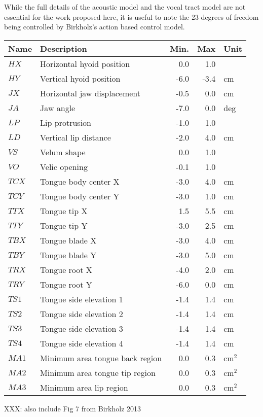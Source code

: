 \documentclass{article}
\begin{document}
While the full details of the acoustic model
and the vocal tract model are not
essential for the work proposed here,
it is useful to note
the 23 degrees of freedom
being controlled by Birkholz's
action based control model.

\begin{tabular}{llrrl}
\toprule
{\bf Name} & {\bf Description} & {\bf Min.} & {\bf Max} & {\bf Unit} \\
\midrule
$HX$ & Horizontal hyoid position & 0.0 & 1.0 & \\
$HY$ & Vertical hyoid position & -6.0 & -3.4 & cm \\
$JX$ & Horizontal jaw displacement & -0.5 & 0.0 & cm \\
$JA$ & Jaw angle & -7.0 & 0.0 & deg \\
$LP$ & Lip protrusion & -1.0 & 1.0 & \\
$LD$ & Vertical lip distance & -2.0 & 4.0 & cm \\
$VS$ & Velum shape & 0.0 & 1.0 & \\
$VO$ & Velic opening & -0.1 & 1.0 & \\
$TCX$ & Tongue body center X & -3.0 & 4.0 & cm \\
$TCY$ & Tongue body center Y & -3.0 & 1.0 & cm \\
$TTX$ & Tongue tip X & 1.5 & 5.5 & cm \\
$TTY$ & Tongue tip Y & -3.0 & 2.5 & cm \\
$TBX$ & Tongue blade X & -3.0 & 4.0 & cm \\
$TBY$ & Tongue blade Y & -3.0 & 5.0 & cm \\
$TRX$ & Tongue root X & -4.0 & 2.0 & cm \\
$TRY$ & Tongue root Y & -6.0 & 0.0 & cm \\
$TS1$ & Tongue side elevation 1 & -1.4 & 1.4 & cm \\
$TS2$ & Tongue side elevation 2 & -1.4 & 1.4 & cm \\
$TS3$ & Tongue side elevation 3 & -1.4 & 1.4 & cm \\
$TS4$ & Tongue side elevation 4 & -1.4 & 1.4 & cm \\
$MA1$ & Minimum area tongue back region & 0.0 & 0.3 & cm$^2$ \\
$MA2$ & Minimum area tongue tip region & 0.0 & 0.3 & cm$^2$ \\
$MA3$ & Minimum area lip region & 0.0 & 0.3 & cm$^2$ \\
\bottomrule
\end{tabular}

XXX: also include Fig 7 from Birkholz 2013
\end{document}
